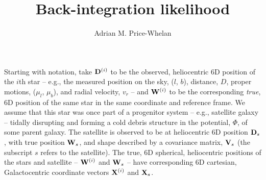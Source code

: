 \documentclass[letterpaper,12pt,preprint]{aastex}
\newcommand{\W}{{\bf W}}
\newcommand{\X}{{\bf X}}
\newcommand{\V}{{\bf V}}
\begin{document}
\title{Back-integration likelihood}
\author{Adrian M. Price-Whelan}

Starting with notation, take ${\bf D}^{(i)}$ to be the observed, heliocentric 6D position of the $i$th star -- e.g., the measured position on the sky, ($l$, $b$), distance, $D$, proper motions, ($\mu_l$, $\mu_b$), and radial velocity, $v_r$ -- and ${\bf W}^{(i)}$ to be the corresponding \emph{true}, 6D position of the same star in the same coordinate and reference frame. We assume that this star was once part of a progenitor system -- e.g., satellite galaxy -- tidally disrupting and forming a cold debris structure in the potential, $\Phi$, of some parent galaxy. The satellite is observed to be at heliocentric 6D position ${\bf D}_s$, with true position ${\bf W}_s$, and shape described by a covariance matrix, $\V_s$ (the subscript $s$ refers to the satellite). The true, 6D spherical, heliocentric positions of the stars and satellite -- $\W^{(i)}$ and $\W_s$ -- have corresponding 6D cartesian, Galactocentric coordinate vectors $\X^{(i)}$ and $\X_s$. 
\end{document}
